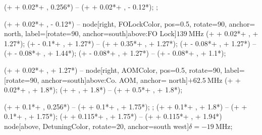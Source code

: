  (\levelLength + \levelConnect + 0.02*\levelLengthLong + \offSet,  0.256*\levelGap) 
-- (\levelLength + \levelConnect + 0.02*\levelLengthLong + \offSet, \excitedStateHigh - 0.12*\levelGap);
;

 (\levelLength + \levelConnect + 0.02*\levelLengthLong + \offSet,  \excitedStateHigh - 0.12*\levelGap) 
-- node[right, FOLockColor, pos=0.5, rotate=90, anchor= north, label={[rotate=90, anchor=south]above:{\scriptsize FO Lock}}]{\scriptsize  $\SI{+139}{\mega \hertz}$} (\levelLength + \levelConnect + 0.02*\levelLengthLong + \offSet, \excitedStateHigh + 1.27*\levelGap);
 (\levelLength + \levelConnect - 0.1*\levelLengthLong + \offSet, \excitedStateHigh + 1.27*\levelGap) 
-- (\levelLength + \levelConnect + 0.35*\levelLengthLong + \offSet, \excitedStateHigh + 1.27*\levelGap);
 (\levelLength + \levelConnect - 0.08*\levelLengthLong + \offSet, \excitedStateHigh + 1.27*\levelGap) -- (\levelLength + \levelConnect - 0.08*\levelLengthLong + \offSet, \excitedStateHigh + 1.44*\levelGap);
 (\levelLength + \levelConnect - 0.08*\levelLengthLong + \offSet, \excitedStateHigh + 1.27*\levelGap) -- (\levelLength + \levelConnect - 0.08*\levelLengthLong + \offSet, \excitedStateHigh + 1.1*\levelGap);

 (\levelLength + \levelConnect + 0.02*\levelLengthLong + \offSet, \excitedStateHigh + 1.27*\levelGap) 
-- node[right, AOMColor, pos=0.5, rotate=90, label={[rotate=90, anchor=south]above:{\scriptsize Co. AOM}}, anchor= north]{\scriptsize  $+\SI{62.5}{\mega \hertz}$} (\levelLength + \levelConnect + 0.02*\levelLengthLong + \offSet, \excitedStateHigh + 1.8*\levelGap);
 (\levelLength + \levelConnect + \offSet, \excitedStateHigh + 1.8*\levelGap) -- (\levelLength + \levelConnect + 0.5*\levelLengthLong + \offSet, \excitedStateHigh + 1.8*\levelGap);

 (\levelLength + \levelConnect + 0.1*\levelLengthLong + \offSet,  0.256*\levelGap) 
-- (\levelLength + \levelConnect + 0.1*\levelLengthLong + \offSet, \excitedStateHigh + 1.75*\levelGap);
;
 (\levelLength + \levelConnect + 0.1*\levelLengthLong + \offSet, \excitedStateHigh + 1.8*\levelGap) -- (\levelLength + \levelConnect + 0.1*\levelLengthLong + \offSet, \excitedStateHigh + 1.75*\levelGap);
 (\levelLength + \levelConnect + 0.115*\levelLengthLong + \offSet, \excitedStateHigh + 1.75*\levelGap) 
-- (\levelLength + \levelConnect + 0.115*\levelLengthLong + \offSet, \excitedStateHigh + 1.94*\levelGap) node[above, DetuningColor, rotate=20, anchor=south west]{\footnotesize $\delta=-\SI{19}{\mega \hertz}$};

